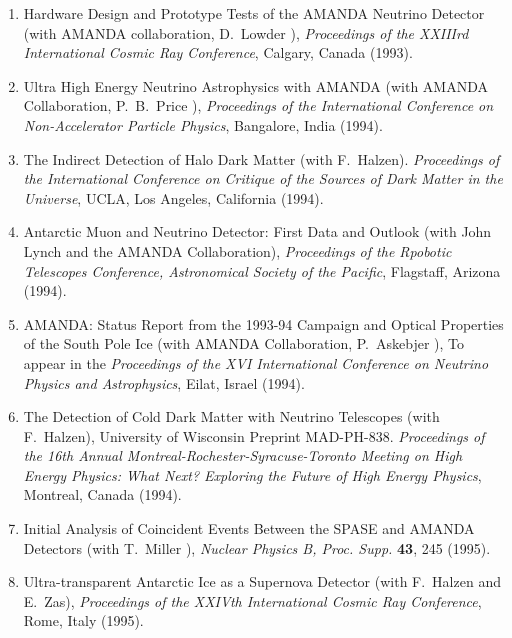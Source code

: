 \begin{enumerate}
\item    Hardware Design and Prototype Tests of the AMANDA Neutrino
         Detector (with AMANDA collaboration, D.~Lowder \etal),
         {\it Proceedings of the 
         XXIIIrd International Cosmic Ray Conference}, Calgary, Canada
         (1993).

\item    Ultra High Energy Neutrino Astrophysics with AMANDA (with
         AMANDA Collaboration, P.~B.~Price \etal),  
         {\it Proceedings of the 
         International
         Conference on Non-Accelerator Particle Physics}, Bangalore,
         India (1994).

\item    The Indirect Detection of Halo Dark Matter (with F.~Halzen).
         {\it Proceedings of the International Conference on Critique of 
         the Sources of Dark Matter in the Universe}, UCLA, Los
         Angeles, California (1994).

\item    Antarctic Muon and Neutrino Detector: First Data and Outlook
         (with John Lynch and the AMANDA Collaboration), 
         {\it Proceedings of the Rpobotic Telescopes Conference, 
         Astronomical Society of the Pacific}, Flagstaff, Arizona (1994).

\item    AMANDA: Status Report from the 1993-94 Campaign and Optical
         Properties of the South Pole Ice (with AMANDA Collaboration,
         P.~Askebjer \etal),
         To appear in the 
         {\it Proceedings of the XVI International 
         Conference on Neutrino Physics and Astrophysics}, Eilat, Israel
         (1994).

\item    The Detection of Cold Dark Matter with Neutrino Telescopes
         (with F.~Halzen), University of Wisconsin Preprint MAD-PH-838.  
         {\it Proceedings of the 
         16th Annual 
         Montreal-Rochester-Syracuse-Toronto Meeting on High Energy 
         Physics: What Next? Exploring the Future of High Energy Physics}, 
         Montreal, Canada (1994).

\item    Initial Analysis of Coincident Events Between the SPASE
         and AMANDA Detectors
         (with T.~Miller \etal),  
         {\it Nuclear Physics B, Proc. Supp.} {\bf 43}, 245 (1995). 

\item    Ultra-transparent Antarctic Ice as a Supernova Detector
         (with F.~Halzen and E.~Zas),
         {\it Proceedings of the 
         XXIVth International Cosmic Ray Conference},
         Rome, Italy (1995).


\end{enumerate}
